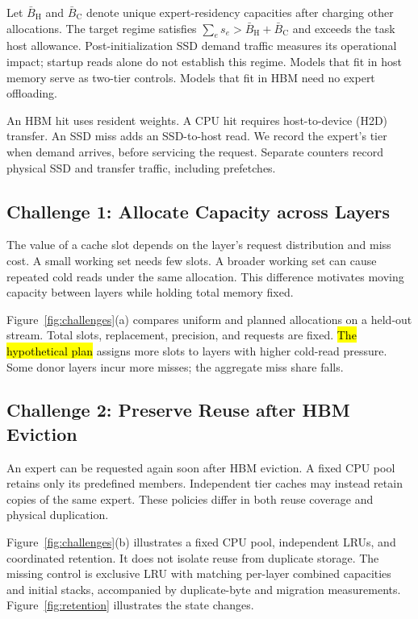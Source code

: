 \documentclass[conference,9pt,letterpaper]{IEEEtran}
\newcommand{\draftnote}[1]{{\sethlcolor{DraftYellow}\hl{#1}}}
\begin{document}
Let $\bar B_{\mathrm H}$ and $\bar B_{\mathrm C}$ denote unique expert-residency capacities after charging other allocations. The target regime satisfies $\sum_e s_e>\bar B_{\mathrm H}+\bar B_{\mathrm C}$ and exceeds the task host allowance. Post-initialization SSD demand traffic measures its operational impact; startup reads alone do not establish this regime. Models that fit in host memory serve as two-tier controls. Models that fit in HBM need no expert offloading.

An HBM hit uses resident weights. A CPU hit requires host-to-device (H2D) transfer. An SSD miss adds an SSD-to-host read. We record the expert's tier when demand arrives, before servicing the request. Separate counters record physical SSD and transfer traffic, including prefetches.

\subsection{Challenge 1: Allocate Capacity across Layers}
The value of a cache slot depends on the layer's request distribution and miss cost. A small working set needs few slots. A broader working set can cause repeated cold reads under the same allocation. This difference motivates moving capacity between layers while holding total memory fixed.

Figure~\ref{fig:challenges}(a) compares uniform and planned allocations on a held-out stream. Total slots, replacement, precision, and requests are fixed. \draftnote{The hypothetical plan} assigns more slots to layers with higher cold-read pressure. Some donor layers incur more misses; the aggregate miss share falls.

\subsection{Challenge 2: Preserve Reuse after HBM Eviction}
An expert can be requested again soon after HBM eviction. A fixed CPU pool retains only its predefined members. Independent tier caches may instead retain copies of the same expert. These policies differ in both reuse coverage and physical duplication.

Figure~\ref{fig:challenges}(b) illustrates a fixed CPU pool, independent LRUs, and coordinated retention. It does not isolate reuse from duplicate storage. The missing control is exclusive LRU with matching per-layer combined capacities and initial stacks, accompanied by duplicate-byte and migration measurements. Figure~\ref{fig:retention} illustrates the state changes.
\end{document}

